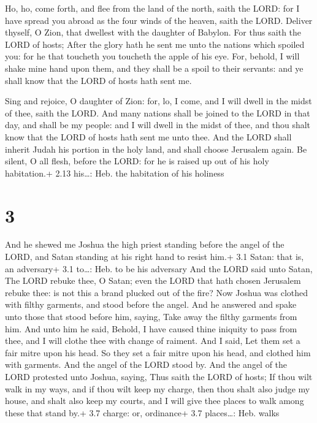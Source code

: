  Ho, ho, come forth, and flee from the land of the north,
saith the LORD: for I have spread you abroad as the four winds of the
heaven, saith the LORD.  Deliver thyself, O Zion, that
dwellest with the daughter of Babylon.  For thus saith the
LORD of hosts; After the glory hath he sent me unto the nations which
spoiled you: for he that toucheth you toucheth the apple of his eye.
 For, behold, I will shake mine hand upon them, and they
shall be a spoil to their servants: and ye shall know that the LORD of
hosts hath sent me.

 Sing and rejoice, O daughter of Zion: for, lo, I come,
and I will dwell in the midst of thee, saith the LORD.  And
many nations shall be joined to the LORD in that day, and shall be my
people: and I will dwell in the midst of thee, and thou shalt know that
the LORD of hosts hath sent me unto thee.  And the LORD
shall inherit Judah his portion in the holy land, and shall choose
Jerusalem again.  Be silent, O all flesh, before the LORD:
for he is raised up out of his holy habitation.+ 2.13 his\ldots: Heb.
the habitation of his holiness

\hypertarget{section-2}{%
\section{3}\label{section-2}}

 And he shewed me Joshua the high priest standing before the
angel of the LORD, and Satan standing at his right hand to resist him.+
3.1 Satan: that is, an adversary+ 3.1 to\ldots: Heb. to be his adversary
 And the LORD said unto Satan, The LORD rebuke thee, O
Satan; even the LORD that hath chosen Jerusalem rebuke thee: is not this
a brand plucked out of the fire?  Now Joshua was clothed
with filthy garments, and stood before the angel.  And he
answered and spake unto those that stood before him, saying, Take away
the filthy garments from him. And unto him he said, Behold, I have
caused thine iniquity to pass from thee, and I will clothe thee with
change of raiment.  And I said, Let them set a fair mitre
upon his head. So they set a fair mitre upon his head, and clothed him
with garments. And the angel of the LORD stood by.  And the
angel of the LORD protested unto Joshua, saying,  Thus saith
the LORD of hosts; If thou wilt walk in my ways, and if thou wilt keep
my charge, then thou shalt also judge my house, and shalt also keep my
courts, and I will give thee places to walk among these that stand by.+
3.7 charge: or, ordinance+ 3.7 places\ldots: Heb. walks

